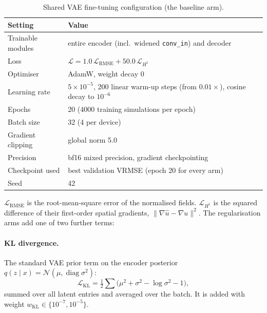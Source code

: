 \begin{table}[htbp]
\centering
\small
\caption{Shared VAE fine-tuning configuration (the baseline arm).}
\label{tab:app_vae_hparams}
\begin{tabular}{ll}
\toprule
Setting & Value \\
\midrule
Trainable modules & entire encoder (incl.\ widened \texttt{conv\_in}) and decoder \\
Loss & $\mathcal{L} = 1.0\,\mathcal{L}_\mathrm{RMSE} + 50.0\,\mathcal{L}_{H^1}$ \\
Optimiser & AdamW, weight decay 0 \\
Learning rate & $5\times10^{-5}$, 200 linear warm-up steps (from $0.01\times$), cosine decay to $10^{-6}$ \\
Epochs & 20 (4000 training simulations per epoch) \\
Batch size & 32 (4 per device) \\
Gradient clipping & global norm 5.0 \\
Precision & bf16 mixed precision, gradient checkpointing \\
Checkpoint used & best validation VRMSE (epoch 20 for every arm) \\
Seed & 42 \\
\bottomrule
\end{tabular}
\end{table}

$\mathcal{L}_\mathrm{RMSE}$ is the root-mean-square error of the normalised
fields. $\mathcal{L}_{H^1}$ is the squared difference of their first-order
spatial gradients, $\lVert \nabla \hat u - \nabla u \rVert^2$. The
regularisation arms add one of two further terms:

\paragraph{KL divergence.} The standard VAE prior term on the encoder
posterior $q(z\mid x) = \mathcal{N}(\mu, \operatorname{diag}\sigma^2)$:
\begin{equation}
  \mathcal{L}_\mathrm{KL} = \tfrac12 \textstyle\sum \bigl(\mu^2 + \sigma^2 - \log\sigma^2 - 1\bigr),
\end{equation}
summed over all latent entries and averaged over the batch. It is added with
weight $w_\mathrm{KL}\in\{10^{-7},10^{-5}\}$.

